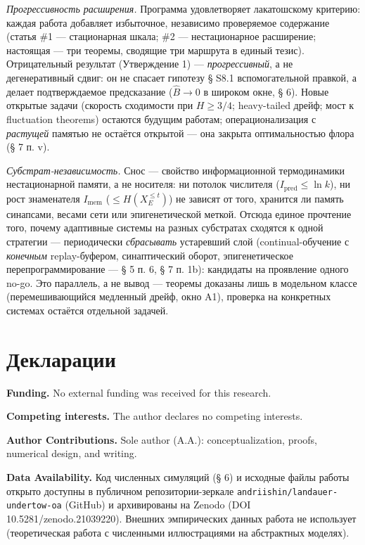 \documentclass[12pt]{iopart}
\begin{document}
\emph{Прогрессивность расширения.} Программа удовлетворяет лакатошскому критерию: каждая работа добавляет избыточное, независимо проверяемое содержание (статья \#1 --- стационарная шкала; \#2 --- нестационарное расширение; настоящая --- три теоремы, сводящие три маршрута в единый тезис). Отрицательный результат (Утверждение 1) --- \emph{прогрессивный}, а не дегенеративный сдвиг: он не спасает гипотезу § S8.1 вспомогательной правкой, а делает подтверждаемое предсказание (\(\hat B \to 0\) в широком окне, § 6). Новые открытые задачи (скорость сходимости при \(H \ge 3/4\); heavy-tailed дрейф; мост к fluctuation theorems) остаются будущим работам; операционализация с \emph{растущей} памятью не остаётся открытой --- она закрыта оптимальностью флора (§ 7 п. v).



\emph{Субстрат-независимость.} Снос --- свойство информационной термодинамики нестационарной памяти, а не носителя: ни потолок числителя (\(I_{\text{pred}} \le \ln k\)), ни рост знаменателя \(I_{\text{mem}}\) (\(\le H(X_E^{\le t})\)) не зависят от того, хранится ли память синапсами, весами сети или эпигенетической меткой. Отсюда единое прочтение того, почему адаптивные системы на разных субстратах сходятся к одной стратегии --- периодически \emph{сбрасывать} устаревший слой (continual-обучение с \emph{конечным} replay-буфером, синаптический оборот, эпигенетическое перепрограммирование --- § 5 п. 6, § 7 п. 1b): кандидаты на проявление одного no-go. Это параллель, а не вывод --- теоремы доказаны лишь в модельном классе (перемешивающийся медленный дрейф, окно A1), проверка на конкретных системах остаётся отдельной задачей.



\section*{Декларации}
\textbf{Funding.} No external funding was received for this research.



\textbf{Competing interests.} The author declares no competing interests.



\textbf{Author Contributions.} Sole author (A.A.): conceptualization, proofs, numerical design, and writing.



\textbf{Data Availability.} Код численных симуляций (§ 6) и исходные файлы работы открыто доступны в публичном репозитории-зеркале \texttt{andriishin/landauer-undertow-oa} (GitHub) и архивированы на Zenodo (DOI 10.5281/zenodo.21039220). Внешних эмпирических данных работа не использует (теоретическая работа с численными иллюстрациями на абстрактных моделях).
\end{document}
